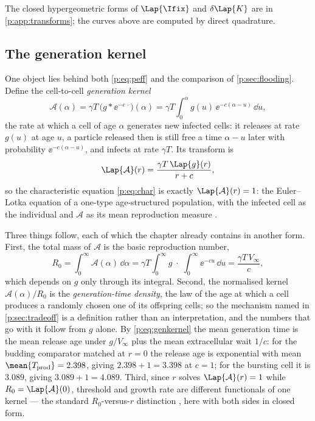 The closed hypergeometric forms of $\Lap{\Ifix}$ and $\delta\Lap{K}$ are in
\cref{p:app:transforms}; the curves above are computed by direct quadrature.

\subsection{The generation kernel}
\label{p:sec:generation-kernel}

One object lies behind both \cref{p:eq:peff} and the comparison of
\cref{p:sec:flooding}. Define the cell-to-cell \emph{generation kernel}
\begin{equation}
\mathcal A(\alpha)
=\gamma T\,\bigl(g*\ee^{-c\,\cdot}\bigr)(\alpha)
=\gamma T\!\int_0^\alpha g(u)\,\ee^{-c(\alpha-u)}\,\dd u,
\label{p:eq:genkernel}
\end{equation}
the rate at which a cell of age $\alpha$ generates new infected cells: it
releases at rate $g(u)$ at age $u$, a particle released then is still free a
time $\alpha-u$ later with probability $\ee^{-c(\alpha-u)}$, and infects at
rate $\gamma T$. Its transform is
\begin{equation}
\Lap{\mathcal A}(r)=\frac{\gamma T\,\Lap{g}(r)}{r+c},
\label{p:eq:Atilde}
\end{equation}
so the characteristic equation \cref{p:eq:char} is exactly
$\Lap{\mathcal A}(r)=1$: the Euler--Lotka equation of a
one-type age-structured population, with the infected cell as the
individual and $\mathcal A$ as its mean reproduction measure
\cite{diekmann1990definition,metz1986dynamics}.

Three things follow, each of which the chapter already contains in another
form. First, the total mass of $\mathcal A$ is the basic reproduction
number,
\begin{equation}
R_0=\int_0^\infty\mathcal A(\alpha)\,\dd\alpha
=\gamma T\int_0^\infty g\;\cdot\;\int_0^\infty\ee^{-cu}\,\dd u
=\frac{\gamma T\,V_\infty}{c},
\label{p:eq:R0gen}
\end{equation}
which depends on $g$ only through its integral. Second, the normalised
kernel $\mathcal A(\alpha)/R_0$ is the \emph{generation-time density}, the
law of the age at which a cell produces a randomly chosen one of its
offspring cells; so the mechanism named in \cref{p:sec:tradeoff} is a
definition rather than an interpretation, and the numbers that go with it
follow from $g$ alone. By
\cref{p:eq:genkernel} the mean generation time is the mean release age under
$g/V_\infty$ plus the mean extracellular wait $1/c$: for the budding
comparator matched at $r=0$ the release age is exponential with mean
$\mean{T_{\rm prod}}=2.398$, giving $2.398+1=3.398$ at $c=1$; for the
bursting cell it is $3.089$, giving $3.089+1=4.089$. Third, since $r$ solves
$\Lap{\mathcal A}(r)=1$ while $R_0=\Lap{\mathcal A}(0)$, threshold and growth
rate are different functionals of one kernel --- the standard
$R_0$-versus-$r$ distinction \cite{wallinga2007generation}, here with both
sides in closed form.

